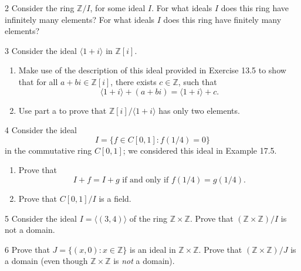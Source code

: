 \begin{problem}{2}
    Consider the ring $\mathbb{Z}/I$, for some ideal $I$. For what ideals $I$ does this
    ring have infinitely many elements? For what ideals $I$ does this ring have finitely
    many elements?
\end{problem}
\unsolved

\begin{problem}{3}
    Consider the ideal $\langle 1 + i \rangle$ in $\mathbb{Z}[i]$.
    \begin{enumerate}
        \item[(a)] Make use of the description of this ideal provided in Exercise 13.5 to
        show that for all $a + bi \in \mathbb{Z}[i]$, there exists $c \in \mathbb{Z}$, such
        that
        \[\langle 1 + i \rangle + (a + bi) = \langle 1 + i \rangle + c.\]
        \item[(b)] Use part a to prove that $\mathbb{Z}[i]/\langle 1 + i \rangle$ has only
        two elements.
    \end{enumerate}
\end{problem}
\unsolved

\begin{problem}{4}
    Consider the ideal
    \[I = \{f \in C[0, 1] : f(1/4) = 0\}\]
    in the commutative ring $C[0, 1]$; we considered this ideal in Example 17.5.
    \begin{enumerate}
        \item[(a)] Prove that
        \[I + f = I + g \text{ if and only if } f(1/4) = g(1/4).\]
        \item[(b)] Prove that $C[0, 1]/I$ is a field.
    \end{enumerate}
\end{problem}
\unsolved

\begin{problem}{5}
    Consider the ideal $I = \langle (3, 4) \rangle$ of the ring
    $\mathbb{Z} \times \mathbb{Z}$. Prove that $(\mathbb{Z} \times \mathbb{Z})/I$ is not a
    domain.
\end{problem}
\unsolved

\begin{problem}{6}
    Prove that $J = \{(x, 0) : x \in \mathbb{Z}\}$ is an ideal in
    $\mathbb{Z} \times \mathbb{Z}$. Prove that $(\mathbb{Z} \times \mathbb{Z})/J$ is a
    domain (even though $\mathbb{Z} \times \mathbb{Z}$ is \emph{not} a domain).
\end{problem}
\unsolved

